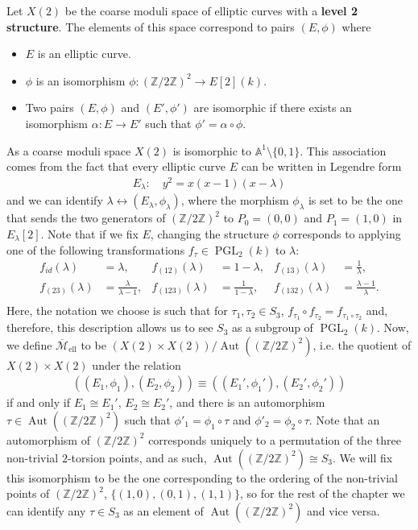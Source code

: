 \documentclass{amsart}
\DeclareMathOperator{\Aut}{Aut}
\newcommand{\PGL}{\operatorname{PGL}}
\newcommand{\mellc}{\overline{\mathcal{M}}_{\text{ell}}}
\numberwithin{equation}{section}
\theoremstyle{definition}
\theoremstyle{remark}
\begin{document}
Let $X(2)$ be the coarse moduli space of elliptic curves with a \textbf{level 2 structure}.
The elements of this space correspond to pairs $(E,\phi)$ where 
\begin{itemize}
    \item $E$ is an elliptic curve.
    \item $\phi$ is an isomorphism $\phi:(\mathbb{Z}/2\mathbb{Z})^2\rightarrow E[2](k)$.
    \item Two pairs $(E,\phi)$ and $(E',\phi')$ are isomorphic if there exists an isomorphism $\alpha:E\rightarrow E'$ such that $\phi'=\alpha\circ\phi.$\\
\end{itemize}
 As a coarse moduli space $X(2)$ is isomorphic to $\mathbb{A}^1\setminus\{0,1\}$. This association comes from the fact that every elliptic curve $E$ can be written in Legendre form 
\begin{align*}
E_\lambda\colon\quad y^2=x(x-1)(x-\lambda)
\end{align*}
and we can identify $\lambda\leftrightarrow(E_\lambda,\phi_\lambda)$, where the morphism $\phi_\lambda$ is set to be the one that sends the two generators of $(\mathbb{Z}/2\mathbb{Z})^2$ to $P_0=(0,0)$ and $P_1=(1,0)$ in $E_\lambda[2]$.\newpage
Note that if we fix $E$, changing the structure $\phi$ corresponds to applying one of the following transformations $f_\tau\in \PGL_2(k)$ to $\lambda$:
\begin{align*}
f_{id}(\lambda)&=\lambda, & f_{(12)}(\lambda)&=1-\lambda, & f_{(13)}(\lambda)&=\frac{1}{\lambda},\\
f_{(23)}(\lambda)&=\frac{\lambda}{\lambda-1}, & f_{(123)}(\lambda)&=\frac{1}{1-\lambda}, & f_{(132)}(\lambda)&=\frac{\lambda-1}{\lambda}.\\
\end{align*}
Here, the notation we choose is such that for $\tau_1,\tau_2\in S_3$, $f_{\tau_1}\circ f_{\tau_2}=f_{\tau_1\circ\tau_2}$ and, therefore, this description allows us to see $S_3$ as a subgroup of $\PGL_2(k)$. Now, we define $\mellc$ to be $(X(2)\times X(2))/\Aut((\mathbb{Z}/2\mathbb{Z})^2)$, i.e. the quotient of $X(2)\times X(2)$ under the relation
\begin{align*}
((E_1,\phi_1),(E_2,\phi_2))\equiv ((E_1',\phi_1'),(E_2',\phi_2'))
\end{align*}
if and only if $E_1\cong E_1'$, $E_2\cong E_2'$, and there is an automorphism $\tau\in\Aut((\mathbb{Z}/2\mathbb{Z})^2)$ such that $\phi'_1=\phi_1\circ\tau$ and $\phi'_2=\phi_2\circ\tau$. Note that an automorphism of $(\mathbb{Z}/2\mathbb{Z})^2$ corresponds uniquely to a permutation of the three non-trivial $2$-torsion points, and as such, 
$\Aut((\mathbb{Z}/2\mathbb{Z})^2)\cong S_3$. We will fix this isomorphism to be the one corresponding to the ordering of the non-trivial points of $(\mathbb{Z}/2\mathbb{Z})^2$, $\{(1,0),(0,1),(1,1)\}$, so for the rest of the chapter we can identify any $\tau\in S_3$ as an element of $\Aut((\mathbb{Z}/2\mathbb{Z})^2)$ and vice versa.  \\
\end{document}
